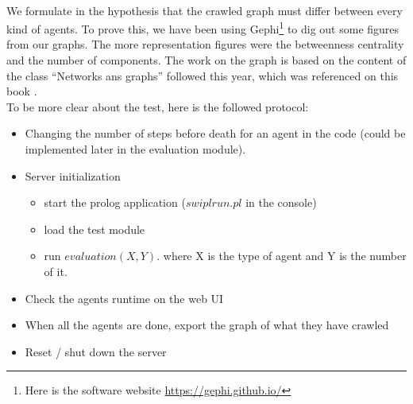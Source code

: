\documentclass{article}
\newenvironment{itemh}[0]{\begin{itemize}[font=\color{mygray} \small]}{\end{itemize}}
\newenvironment{itemH}[0]{\begin{itemize}[font=\color{mygray} \large]}{\end{itemize}}
\begin{document}
		\paragraph{}
			We formulate in the hypothesis that the crawled graph must differ between every kind of agents.
			To prove this, we have been using Gephi\footnote{
				Here is the software website \url{https://gephi.github.io/}
			} to dig out some figures from our graphs.
			The more representation figures were the betweenness centrality and the number of components.
			The work on the graph is based on the content of the class ``Networks ans graphs'' followed this year,
			which was referenced on this book \cite{Steen10}.\\
		\newline
			To be more clear about the test, here is the followed protocol:
			\begin{itemH}
				\item Changing the number of steps before death for an agent in the code
				(could be implemented later in the evaluation module).
				\item Server initialization
				\begin{itemh}
					\item start the prolog application ($swipl run.pl$ in the console)
					\item load the test module
					\item run $evaluation(X,Y).$ where X is the type of agent and Y is the number of it.
				\end{itemh}
				\item Check the agents runtime on the web UI
				\item When all the agents are done, export the graph of what they have crawled
				\item Reset / shut down the server
			\end{itemH}
\end{document}
